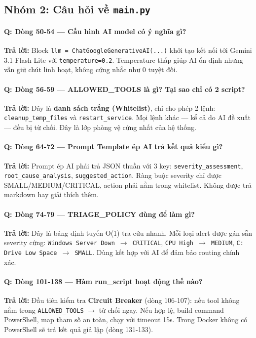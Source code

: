 \documentclass[12pt,a4paper]{article}
\begin{document}
\subsection{Nhóm 2: Câu hỏi về \texttt{main.py}}

\paragraph{Q: Dòng 50-54 — Cấu hình AI model có ý nghĩa gì?}
\textbf{Trả lời:} Block \texttt{llm = ChatGoogleGenerativeAI(...)} khởi tạo kết nối tới Gemini 3.1 Flash Lite với \texttt{temperature=0.2}. Temperature thấp giúp AI ổn định nhưng vẫn giữ chút linh hoạt, không cứng nhắc như 0 tuyệt đối.

\paragraph{Q: Dòng 56-59 — ALLOWED\_TOOLS là gì? Tại sao chỉ có 2 script?}
\textbf{Trả lời:} Đây là \textbf{danh sách trắng (Whitelist)}, chỉ cho phép 2 lệnh: \texttt{cleanup\_temp\_files} và \texttt{restart\_service}. Mọi lệnh khác — kể cả do AI đề xuất — đều bị từ chối. Đây là lớp phòng vệ cứng nhất của hệ thống.

\paragraph{Q: Dòng 64-72 — Prompt Template ép AI trả kết quả kiểu gì?}
\textbf{Trả lời:} Prompt ép AI phải trả JSON thuần với 3 key: \texttt{severity\_assessment}, \texttt{root\_cause\_analysis}, \texttt{suggested\_action}. Ràng buộc severity chỉ được SMALL/MEDIUM/CRITICAL, action phải nằm trong whitelist. Không được trả markdown hay giải thích thêm.

\paragraph{Q: Dòng 74-79 — TRIAGE\_POLICY dùng để làm gì?}
\textbf{Trả lời:} Đây là bảng định tuyến O(1) tra cứu nhanh. Mỗi loại alert được gán sẵn severity cứng: \texttt{Windows Server Down $\rightarrow$ CRITICAL}, \texttt{CPU High $\rightarrow$ MEDIUM}, \texttt{C: Drive Low Space $\rightarrow$ SMALL}. Dùng kết hợp với AI để đảm bảo routing chính xác.

\paragraph{Q: Dòng 101-138 — Hàm run\_script hoạt động thế nào?}
\textbf{Trả lời:} Đầu tiên kiểm tra \textbf{Circuit Breaker} (dòng 106-107): nếu tool không nằm trong \texttt{ALLOWED\_TOOLS} $\rightarrow$ từ chối ngay. Nếu hợp lệ, build command PowerShell, map tham số an toàn, chạy với timeout 15s. Trong Docker không có PowerShell sẽ trả kết quả giả lập (dòng 131-133).
\end{document}
